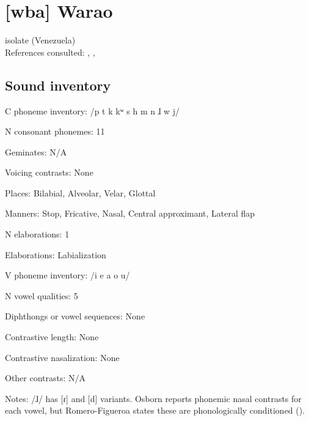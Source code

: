 {\section*{[wba] Warao} %
isolate (Venezuela)\medskip\\
References consulted: \citet{Arinterol2000}, \citet{Osborn1966}, \citet{Romero-Figeroa1997}

\subsection*{Sound inventory}
\begin{appendixdesc}

\item[C phoneme inventory:] /p t k kʷ s h m n ɺ w j/

\item[N consonant phonemes:] 11

\item[Geminates:] N/A

\item[Voicing contrasts:] None

\item[Places:] Bilabial, Alveolar, Velar, Glottal

\item[Manners:] Stop, Fricative, Nasal, Central approximant, Lateral flap

\item[N elaborations:] 1

\item[Elaborations:] Labialization

\item[V phoneme inventory:] /i e a o u/

\item[N vowel qualities:] 5

\item[Diphthongs or vowel sequences:] None

\item[Contrastive length:] None

\item[Contrastive nasalization:] None

\item[Other contrasts:] N/A

\item[Notes:] /ɺ/ has [ɾ] and [d] variants. Osborn reports phonemic nasal contrasts for each vowel, but Romero-Figueroa states these are phonologically conditioned (\citeyear[108]{Romero-Figeroa1997}).
\end{appendixdesc}
}
